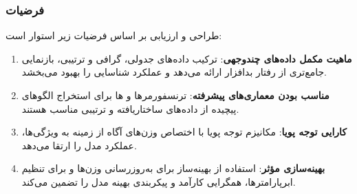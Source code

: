 \subsubsection{فرضیات}
طراحی و ارزیابی  بر اساس فرضیات زیر استوار است:
\begin{enumerate}
    \renewcommand{\labelitemi}{\lr{$\bullet$}}
    \item \textbf{ماهیت مکمل داده‌های چندوجهی}: ترکیب داده‌های جدولی، گرافی و ترتیبی، بازنمایی جامع‌تری از رفتار بدافزار ارائه می‌دهد و عملکرد شناسایی را بهبود می‌بخشد.
    \item \textbf{مناسب بودن معماری‌های پیشرفته}: ترنسفورمرها و ها برای استخراج الگوهای پیچیده از داده‌های ساختاریافته و ترتیبی مناسب هستند.
    \item \textbf{کارایی توجه پویا}: مکانیزم توجه پویا با اختصاص وزن‌های آگاه از زمینه به ویژگی‌ها، عملکرد مدل را ارتقا می‌دهد.
    \item \textbf{بهینه‌سازی مؤثر}: استفاده از بهینه‌ساز  برای به‌روزرسانی وزن‌ها و  برای تنظیم ابرپارامترها، همگرایی کارآمد و پیکربندی بهینه مدل را تضمین می‌کند.
\end{enumerate}


